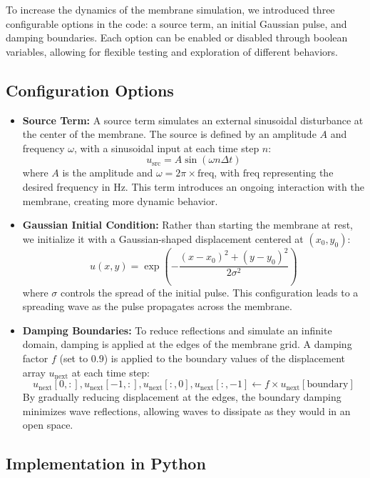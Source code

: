 \documentclass{article}
\begin{document}
To increase the dynamics of the membrane simulation, we introduced three configurable options in the code: a source term, an initial Gaussian pulse, and damping boundaries. Each option can be enabled or disabled through boolean variables, allowing for flexible testing and exploration of different behaviors.

\subsection{Configuration Options}

\begin{itemize}
    \item \textbf{Source Term:} A source term simulates an external sinusoidal disturbance at the center of the membrane. The source is defined by an amplitude $A$ and frequency $\omega$, with a sinusoidal input at each time step $n$:
    \[
    u_{\text{src}} = A \sin(\omega n \Delta t)
    \]
    where $A$ is the amplitude and $\omega = 2 \pi \times \text{freq}$, with $\text{freq}$ representing the desired frequency in Hz. This term introduces an ongoing interaction with the membrane, creating more dynamic behavior.

    \item \textbf{Gaussian Initial Condition:} Rather than starting the membrane at rest, we initialize it with a Gaussian-shaped displacement centered at $(x_0, y_0)$:
    \[
    u(x, y) = \exp\left(-\frac{(x - x_0)^2 + (y - y_0)^2}{2\sigma^2}\right)
    \]
    where $\sigma$ controls the spread of the initial pulse. This configuration leads to a spreading wave as the pulse propagates across the membrane.

    \item \textbf{Damping Boundaries:} To reduce reflections and simulate an infinite domain, damping is applied at the edges of the membrane grid. A damping factor $f$ (set to $0.9$) is applied to the boundary values of the displacement array $u_{\text{next}}$ at each time step:
    \[
    u_{\text{next}}[0, :], u_{\text{next}}[-1, :], u_{\text{next}}[:, 0], u_{\text{next}}[:, -1] \leftarrow f \times u_{\text{next}}[\text{boundary}]
    \]
    By gradually reducing displacement at the edges, the boundary damping minimizes wave reflections, allowing waves to dissipate as they would in an open space.
\end{itemize}

\subsection{Implementation in Python}
\end{document}
